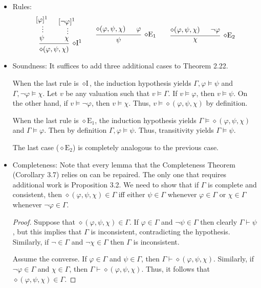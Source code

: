 \documentclass[a4paper]{article}
\begin{document}
\section{}
\begin{itemize}
\item Rules:
  \[
    \begin{prooftree}
      \hypo{[\varphi]^{1}}
      \ellipsis{}{\psi}
      \hypo{[\lnot\varphi]^{1}}
      \ellipsis{}{\chi}
      \infer2[$\diamond$I$^1$]{\diamond(\varphi,\psi,\chi)}
    \end{prooftree}
    \qquad
    \begin{prooftree}
      \hypo{\diamond(\varphi,\psi,\chi)}
      \hypo{\varphi}
      \infer2[$\diamond$E$_{1}$]{\psi}
    \end{prooftree}
    \qquad
    \begin{prooftree}
      \hypo{\diamond(\varphi,\psi,\chi)}
      \hypo{\lnot\varphi}
      \infer2[$\diamond$E$_{2}$]{\chi}
    \end{prooftree}
  \]
\item Soundness: It suffices to add three additional cases to Theorem 2.22.

  When the last rule is $\diamond\text{I}$, the induction hypothesis yields $\Gamma,\varphi \models \psi$ and $\Gamma,\lnot\varphi \models \chi$.
  Let $v$ be any valuation such that $v \models \Gamma$.
  If $v \models \varphi$, then $v \models \psi$.
  On the other hand, if $v \models \lnot\varphi$, then $v \models \chi$.
  Thus, $v \models \diamond(\varphi,\psi,\chi)$ by definition.

  When the last rule is $\diamond\text{E}_{1}$, the induction hypothesis yields $\Gamma \models \diamond(\varphi,\psi,\chi)$ and $\Gamma \models \varphi$.
  Then by definition $\Gamma,\varphi \models \psi$.
  Thus, transitivity yields $\Gamma \models \psi$.

  The last case ($\diamond\text{E}_{2}$) is completely analogous to the previous case.
\item Completeness: Note that every lemma that the Completeness Theorem (Corollary 3.7) relies on can be repaired.
  The only one that requires additional work is Proposition 3.2.
  We need to show that if $\Gamma$ is complete and consistent, then $\diamond(\varphi,\psi,\chi) \in \Gamma$ iff either $\psi \in \Gamma$ whenever $\varphi \in \Gamma$ or $\chi \in \Gamma$ whenever $\lnot \varphi \in \Gamma$.
  \begin{proof}
    Suppose that $\diamond(\varphi,\psi,\chi) \in \Gamma$.
    If $\varphi \in \Gamma$ and $\lnot\psi \in \Gamma$ then clearly $\Gamma \vdash \psi$, but this implies that $\Gamma$ is inconsistent, contradicting the hypothesis.
    Similarly, if $\lnot \in \Gamma$ and $\lnot \chi \in \Gamma$ then $\Gamma$ is inconsistent.

    Assume the converse.
    If $\varphi \in \Gamma$ and $\psi \in \Gamma$, then $\Gamma \vdash \diamond(\varphi,\psi,\chi)$.
    Similarly, if $\lnot\varphi \in \Gamma$ and $\chi \in \Gamma$, then $\Gamma \vdash \diamond(\varphi,\psi,\chi)$.
    Thus, it follows that $\diamond(\varphi,\psi,\chi) \in \Gamma$.
  \end{proof}
\end{itemize}

\end{document}
